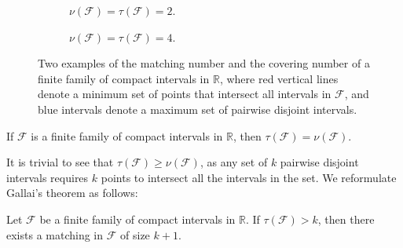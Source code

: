 \documentclass[letterpaper, reqno,12pt]{article}
\newcommand{\RR}{\mathbb{R}}
\begin{document}
\begin{figure}[h]
  \centering
  \begin{subfigure}[b]{0.45\textwidth}
    \centering
    \caption{$\nu(\mathcal F) = \tau(\mathcal F) = 2$.}
  \end{subfigure}
  \hfill
  \begin{subfigure}[b]{0.45\textwidth}
    \centering
    \caption{$\nu(\mathcal F) = \tau(\mathcal F) = 4$.}
  \end{subfigure}
  \caption{Two examples of the matching number and the covering number of a finite family of compact intervals in $\RR$, where red vertical lines denote a minimum set of points that intersect all intervals in $\mathcal F$, and blue intervals denote a maximum set of pairwise disjoint intervals.}
  \label{fig:nu-tau}
\end{figure}

\begin{theorem}[Gallai, 1960]
  If $\mathcal F$ is a finite family of compact intervals in $\RR$, then $\tau(\mathcal F) = \nu(\mathcal F)$.
\end{theorem}

It is trivial to see that $\tau(\mathcal F) \geq \nu(\mathcal F)$, as any set of $k$ pairwise disjoint intervals requires $k$ points to intersect all the intervals in the set. We reformulate Gallai's theorem as follows:

\begin{theorem}[Gallai, 1960]
  Let $\mathcal F$ be a finite family of compact intervals in $\RR$. If $\tau(\mathcal F) > k$, then there exists a matching in $\mathcal F$ of size $k + 1$.
\end{theorem}
\end{document}
